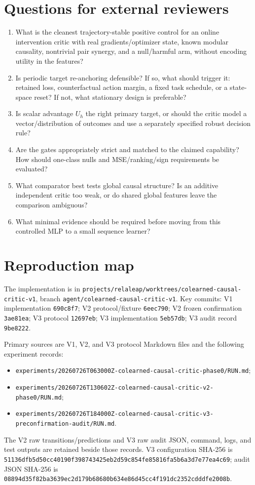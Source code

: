 \documentclass[11pt]{article}
\begin{document}
\section{Questions for external reviewers}
\begin{enumerate}
\item What is the cleanest trajectory-stable positive control for an online intervention critic with real gradients/optimizer state, known modular causality, nontrivial pair synergy, and a null/harmful arm, without encoding utility in the features?
\item Is periodic target re-anchoring defensible? If so, what should trigger it: retained loss, counterfactual action margin, a fixed task schedule, or a state-space reset? If not, what stationary design is preferable?
\item Is scalar advantage $U_h$ the right primary target, or should the critic model a vector/distribution of outcomes and use a separately specified robust decision rule?
\item Are the gates appropriately strict and matched to the claimed capability? How should one-class nulls and MSE/ranking/sign requirements be evaluated?
\item What comparator best tests global causal structure? Is an additive independent critic too weak, or do shared global features leave the comparison ambiguous?
\item What minimal evidence should be required before moving from this controlled MLP to a small sequence learner?
\end{enumerate}

\section{Reproduction map}
The implementation is in \texttt{projects/relaleap/worktrees/colearned-causal-critic-v1}, branch \texttt{agent/colearned-causal-critic-v1}. Key commits: V1 implementation \texttt{690c8f7}; V2 protocol/fixture \texttt{6eec790}; V2 frozen confirmation \texttt{3ae81ea}; V3 protocol \texttt{12697eb}; V3 implementation \texttt{5eb57db}; V3 audit record \texttt{9be8222}.

Primary sources are V1, V2, and V3 protocol Markdown files and the following experiment records:
\begin{itemize}
\item \texttt{experiments/20260726T063000Z-colearned-causal-critic-phase0/RUN.md};
\item \texttt{experiments/20260726T130602Z-colearned-causal-critic-v2-phase0/RUN.md};
\item \texttt{experiments/20260726T184000Z-colearned-causal-critic-v3-preconfirmation-audit/RUN.md}.
\end{itemize}
The V2 raw transitions/predictions and V3 raw audit JSON, command, logs, and test outputs are retained beside those records. V3 configuration SHA-256 is \texttt{51136dfb5d50cc40190f398743425eb2d59c854fe85816fa5b6a3d7e77ea4c69}; audit JSON SHA-256 is \texttt{08894d35f82ba3639ec2d179b68680b634e86d45cc4f191dc2352cdddfe2008b}.
\end{document}

